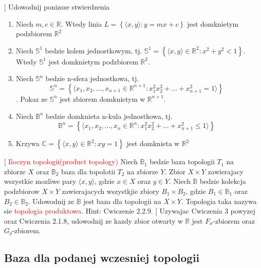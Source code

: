 \documentclass{article}
\makeatletter
\def\myitem{%
   \@ifnextchar[ \@myitem{\@noitemargtrue\@myitem[\@itemlabel]}}
\def\@myitem[#1]{\item[#1]\mbox{}\\}
\makeatother
\begin{document}
\begin{enumerate}[align=left]
\begin{enumerate}
        \end{enumerate}
        \myitem Udowodnij ponizsze stwierdzenia
        \begin{enumerate}
            \item Niech $m,c \in \mathbb{R}$. Wtedy linia $L = \left\{ \langle x,y \rangle: y = mx + c \right\}$ jest domknietym podzbiorem $\mathbb{R}^{2}$
            \item Niech $\mathbb{S}^1$ bedzie kolem jednostkowym, tj. $\mathbb{S}^{1} = \left\{ \langle x,y \rangle \in \mathbb{R}^{2} : x^{2} + y^{2} < 1  \right\}$. Wtedy $\mathbb{S}^{1}$ jest domknietym podzbiorem $\mathbb{R}^2$.
            \item Niech $ \mathbb{S}^n$ bedzie n-sfera jednostkowa, tj. $$\mathbb{S}^{n} = \left\{ \langle x_{1}, x_{2}, \dots, x_{n+1} \in \mathbb{R}^{n+1} : x_{1}^{2} x_{2}^{2} + \dots + x_{n+1}^{2} = 1 \rangle \right\}$$. Pokaz ze $\mathbb{S}^n$ jest zbiorem domknietym w $\mathbb{R}^{n+1}$.
            \item Niech $\mathbb{B}^{n}$ bedzie domknieta n-kula jednostkowa, tj.
                $$\mathbb{B}^{n} = \left\{ \langle x_{1}, x_{2}, \dots, x_{n} \in \mathbb{R}^{n} : x_{1}^{2} x_{2}^{2} + \dots + x_{n+1}^{2} \leq 1 \rangle \right\}$$             
            \item Krzywa $\mathbb{C} = \left\{ \langle x,y \rangle \in \mathbb{R}^{2}:  xy = 1    \right\}$ jest domknieta w $\mathbb{R}^{2}$
            
        \end{enumerate}

        \myitem \textcolor{red}{Iloczyn topologii(product topology)}
        Niech $\mathbb{B}_{1}$ bedzie baza topologii $T_{1}$ na zbiorze $X$ oraz $\mathbb{B}_{2}$ baza dla topolotii $T_{2}$ na zbiorze $Y$. Zbior $X \times Y$ zawierajacy wszystkie mozliwe pary $\langle x, y \rangle$, gdzie $x \in X$ oraz $y \in Y$. Niech $\mathbb{B}$ bedzie kolekcja podzbiorow $X \times Y$ zawierajacych wszystkjie zbiory $B_{1} \times B_{2}$, gdzie $B_{1} \in \mathbb{B}_{1}$ oraz $B_{2} \in \mathbb{B}_{2}$. Udowodnij ze $\mathbb{B}$ jest baza dla topologii na $X \times Y$. Topologia taka nazywa sie \textcolor{red}{topologia produktowa}. Hint: Cwiczenie 2.2.9.
        \myitem Uzywajac Cwiczenia 3 powyzej oraz Cwiczenia 2.1.8, udowodnij ze kazdy zbior otwarty w $\mathbb{R}$ jest $F_{\sigma}$-zbiorem oraz $G_{\delta}$-zbiorem.
        
\end{enumerate}%
\subsection{Baza dla podanej wczesniej topologii}
\end{document}
